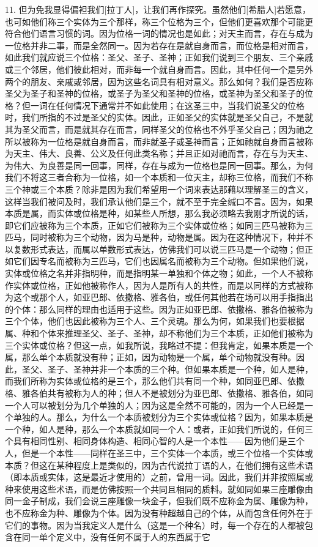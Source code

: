 11. 但为免我显得偏袒我们[拉丁人]，让我们再作探究。虽然他们[希腊人]若愿意，也可如他们称三个实体为三个那样，称三个位格为三个，但他们更喜欢那个可能更符合他们语言习惯的词。因为位格一词的情况也是如此；对天主而言，存在与成为一位格并非二事，而是全然同一。因为若存在是就自身而言，而位格是相对而言，如此我们就应说三个位格：圣父、圣子、圣神；正如我们说到三个朋友、三个亲戚或三个邻居，他们彼此相对，而非每一个就自身而言。因此，其中任何一个是另外两个的朋友、亲戚或邻居，因为这些名词具有相对意义。那么如何？我们是否应称圣父为圣子和圣神的位格，或圣子为圣父和圣神的位格，或圣神为圣父和圣子的位格？但一词在任何情况下通常并不如此使用；在这圣三中，当我们说圣父的位格时，我们所指的不过是圣父的实体。因此，正如圣父的实体就是圣父自己，不是就其为圣父而言，而是就其存在而言，同样圣父的位格也不外乎圣父自己；因为祂之所以被称为一位格是就自身而言，而非就圣子或圣神而言；正如祂就自身而言被称为天主、伟大、良善、公义及任何此类名称；并且正如对祂而言，存在与为天主、为伟大、为良善是同一回事，同样，存在与成为一位格也是同一回事。那么，为何我们不将这三者合称为一位格，如一个本质和一位天主，却称三位格，而我们不称三个神或三个本质？除非是因为我们希望用一个词来表达那藉以理解圣三的含义，这样当我们被问及时，我们承认他们是三个，就不至于完全缄口不言。因为，如果本质是属，而实体或位格是种，如某些人所想，那么我必须略去我刚才所说的话，即它们应被称为三个本质，正如它们被称为三个实体或位格；如同三匹马被称为三匹马，同时被称为三个动物，因为马是种，动物是属。因为在这种情况下，种并不以复数形式表达，而属以单数形式表达，仿佛我们可以说三匹马是一个动物；但正如它们因专名而被称为三匹马，它们也因属名而被称为三个动物。但如果他们说，实体或位格之名并非指明种，而是指明某一单独和个体之物；如此，一个人不被称作实体或位格，正如他被称作人，因为人是所有人的共性，而是以同样的方式被称为这个或那个人，如亚巴郎、依撒格、雅各伯，或任何其他若在场可以用手指指出的个体：那么同样的理由也适用于这些。因为正如亚巴郎、依撒格、雅各伯被称为三个个体，他们也因此被称为三个人、三个灵魂。那么为何，如果我们也要根据属、种和个体来推理圣父、圣子、圣神，却不称他们为三个本质，正如他们被称为三个实体或位格？但这一点，如我所说，我略过不提：但我肯定，如果本质是一个属，那么单个本质就没有种；正如，因为动物是一个属，单个动物就没有种。因此，圣父、圣子、圣神并非一个本质的三个种。但如果本质是一个种，如人是种，而我们所称为实体或位格的是三个，那么他们共有同一个种，如同亚巴郎、依撒格、雅各伯共有被称为人的种；但人不是被划分为亚巴郎、依撒格、雅各伯，如同一个人可以被划分为几个单独的人；因为这是全然不可能的，因为一个人已经是一个单独的人。那么，为什么一个本质被划分为三个实体或位格？因为，如果本质是一个种，如人是种，那么一个本质就如同一个人：或者，正如我们所说的，任何三个具有相同性别、相同身体构造、相同心智的人是一个本性——因为他们是三个人，但是一个本性——同样在圣三中，三个实体一个本质，或三个位格一个实体或本质？但这在某种程度上是类似的，因为古代说拉丁语的人，在他们拥有这些术语（即本质或实体，这是最近才使用的）之前，曾用一词。因此，我们并非按照属或种来使用这些术语，而是仿佛按照一个共同且相同的质料。就如同如果三座雕像由同一金子制成，我们会说三座雕像一块金子，但我们既不应称金为属、雕像为种，也不应称金为种、雕像为个体。因为没有种超越自己的个体，从而包含任何外在于它们的事物。因为当我定义人是什么（这是一个种名）时，每一个存在的人都被包含在同一单个定义中，没有任何不属于人的东西属于它